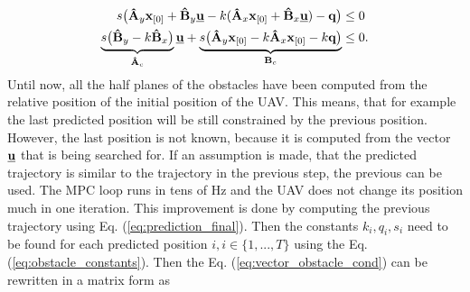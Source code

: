 \documentclass[a4paper,11pt,titlepage]{article}
\newcommand{\uvec}{\textbf{\underline{u}}}
\begin{document}
\begin{equation}
\begin{split}
s\big(\textbf{\^A}_y \textbf{x}_{[0]} + \textbf{\^B}_y \uvec - k(\textbf{\^A}_x \textbf{x}_{[0]} + \textbf{\^B}_x \uvec) - \textbf{q}\big) &\leq 0 \\
\underbrace{s\big(\textbf{\^B}_y-k\textbf{\^B}_x\big)}_{\textbf{\^A}_c} \uvec +
\underbrace{s\big(\textbf{\^A}_y \textbf{x}_{[0]} - k\textbf{\^A}_x \textbf{x}_{[0]} -k\textbf{q}\big)}_{\textbf{B}_c} &\leq 0.
\end{split}
\end{equation}
Until now, all the half planes of the obstacles have been computed from the relative position of the initial position of the UAV. This means, that for example the last predicted position will be still constrained by the previous position. However, the last position is not known, because it is computed from the vector $\uvec$ that is being searched for. If an assumption is made, that the predicted trajectory is similar to the trajectory in the previous step, the previous can be used. The MPC loop runs in tens of Hz and the UAV does not change its position much in one iteration. This improvement is done by computing the previous trajectory using Eq. (\ref{eq:prediction_final}). Then the constants $k_{i}, q_{i}, s_{i}$ need to be found for each predicted position $i, i\in\{1,...,T\}$ using the Eq. (\ref{eq:obstacle_constants}). Then the Eq. (\ref{eq:vector_obstacle_cond}) can be rewritten in a matrix form as
\end{document}
